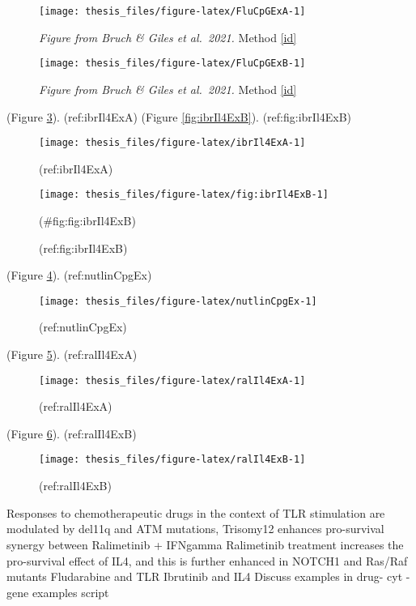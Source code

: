 \documentclass[11pt, a4paper, twosided]{book}
\begin{document}
\begin{figure}

{\centering \texttt{[image: thesis\_files/figure-latex/FluCpGExA-1]} 

}

\caption{\emph{Figure from Bruch \& Giles et al.~2021.} Method \ref{id}}\label{fig:FluCpGExA}
\end{figure}
\begin{figure}

{\centering \texttt{[image: thesis\_files/figure-latex/FluCpGExB-1]} 

}

\caption{\emph{Figure from Bruch \& Giles et al.~2021.} Method \ref{id}}\label{fig:FluCpGExB}
\end{figure}
(Figure \ref{fig:ibrIl4ExA}).
(ref:ibrIl4ExA)
(Figure \ref{fig:ibrIl4ExB}).
(ref:fig:ibrIl4ExB)
\begin{figure}

{\centering \texttt{[image: thesis\_files/figure-latex/ibrIl4ExA-1]} 

}

\caption{(ref:ibrIl4ExA)}\label{fig:ibrIl4ExA}
\end{figure}
\begin{figure}

{\centering \texttt{[image: thesis\_files/figure-latex/fig:ibrIl4ExB-1]} 

}

\caption{(ref:fig:ibrIl4ExB)}(\#fig:fig:ibrIl4ExB)
\end{figure}
(Figure \ref{fig:nutlinCpgEx}).
(ref:nutlinCpgEx)
\begin{figure}

{\centering \texttt{[image: thesis\_files/figure-latex/nutlinCpgEx-1]} 

}

\caption{(ref:nutlinCpgEx)}\label{fig:nutlinCpgEx}
\end{figure}
(Figure \ref{fig:ralIl4ExA}).
(ref:ralIl4ExA)
\begin{figure}

{\centering \texttt{[image: thesis\_files/figure-latex/ralIl4ExA-1]} 

}

\caption{(ref:ralIl4ExA)}\label{fig:ralIl4ExA}
\end{figure}
(Figure \ref{fig:ralIl4ExB}).
(ref:ralIl4ExB)
\begin{figure}

{\centering \texttt{[image: thesis\_files/figure-latex/ralIl4ExB-1]} 

}

\caption{(ref:ralIl4ExB)}\label{fig:ralIl4ExB}
\end{figure}
Responses to chemotherapeutic drugs in the context of TLR stimulation are modulated by del11q and ATM mutations,
Trisomy12 enhances pro-survival synergy between Ralimetinib + IFNgamma
Ralimetinib treatment increases the pro-survival effect of IL4, and this is further enhanced in NOTCH1 and Ras/Raf mutants
Fludarabine and TLR
Ibrutinib and IL4
Discuss examples in drug- cyt -gene examples script
\end{document}
